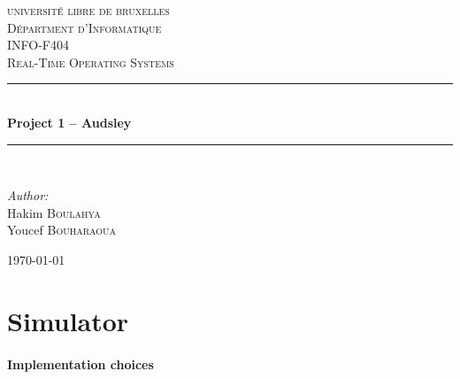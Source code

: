 \documentclass[letterpaper]{article}
\newcommand{\HRule}{\rule{\linewidth}{0.5mm}} %
\begin{document}
\begin{titlepage}
\begin{center}


\textsc{\LARGE universit\'e libre de bruxelles}\\[1.0cm]
\textsc{\Large D\'epartment d'Informatique}\\[1.5cm]


\textsc{
\large INFO-F404 \\
\Large  Real-Time Operating Systems
 \\[1cm]}
\HRule \\[0.7cm]

{ \huge \bfseries Project 1 – Audsley  \\[0.7cm] }

\HRule \\[2cm]

\noindent
\begin{center} \large

\emph{Author:}\\
\Large Hakim \textsc{Boulahya}\\
Youcef \textsc{Bouharaoua}
\end{center}
\begin{center} \large


\end{center}

\vfill

{\large \today}

\end{center}
\end{titlepage}

\tableofcontents
\newpage

\section{Simulator}

\paragraph{Implementation choices}
\end{document}

